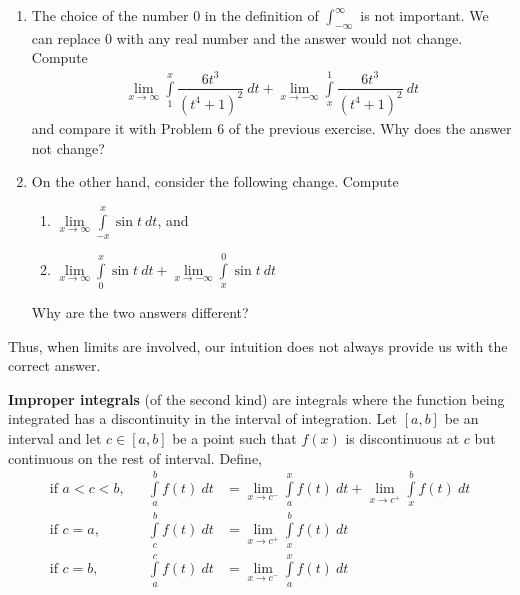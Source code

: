 \begin{exercise}
  \begin{enumerate}
    \item The choice of the number 0 in the definition of $\int_{-\infty}^{\infty}$ is not important. We can replace 0 with any real number and the answer would not change.
    Compute
    \begin{align*}
      \lim \limits_{x \rightarrow \infty}\int \limits_1^{x} \dfrac{6 t^3}{(t^4 + 1)^2} \: dt
      +
      \lim \limits_{x \rightarrow -\infty}\int \limits_{x}^1 \dfrac{6 t^3}{(t^4 + 1)^2} \: dt
    \end{align*}
    and compare it with Problem 6 of the previous exercise. Why does the answer not change?

    \item On the other hand, consider the following change.
    Compute
    \begin{enumerate}
      \item $\lim \limits_{x \rightarrow \infty}\int \limits_{-x}^{x} \sin t \: dt$, and
      \item $\lim \limits_{x \rightarrow \infty}\int \limits_0^{x} \sin t \: dt
      +
      \lim \limits_{x \rightarrow -\infty}\int \limits_{x}^{0} \sin t \: dt$
    \end{enumerate}
    Why are the two answers different?
  \end{enumerate}
  Thus, when limits are involved, our intuition does not always provide us with the correct answer.
\end{exercise}

\begin{definition}
  {\bf Improper integrals} (of the second kind) are integrals where the function being integrated has a discontinuity in the interval of integration.
  Let $[a,b]$ be an interval and let $c \in [a, b]$ be a point such that $f(x)$ is discontinuous at $c$ but continuous on the rest of interval. Define,
	\begin{align*}
    \mbox{if } a < c < b, &&
    \int \limits_a^b f(t) \: dt
		 & =
		\lim \limits_{x \rightarrow c^{-}}\int \limits_a^{x} f(t) \: dt
    +
    \lim \limits_{x \rightarrow c^{+}}\int \limits_{x}^{b} f(t) \: dt \\
    \mbox{if } c = a, &&
    \int \limits_c^b f(t) \: dt
		 & =
    \lim \limits_{x \rightarrow c^{+}}\int \limits_{x}^{b} f(t) \: dt \\
    \mbox{if } c = b, &&
    \int \limits_a^c f(t) \: dt
		 & =
		\lim \limits_{x \rightarrow c^{-}}\int \limits_a^{x} f(t) \: dt
	\end{align*}
\end{definition}


